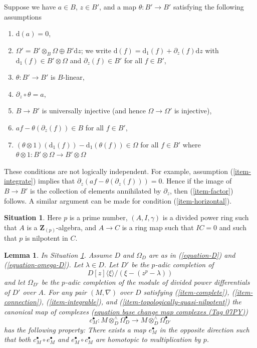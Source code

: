 \documentclass{amsart}
\theoremstyle{plain}
\newtheorem{lemma}[subsection]{Lemma}
\theoremstyle{definition}
\newtheorem{situation}[subsection]{Situation}
\theoremstyle{remark}
\numberwithin{equation}{subsection}
\begin{document}
\medskip\noindent
Suppose we have $a \in B$, $z \in B'$, and a map $\theta : B' \to B'$
satisfying the following assumptions
\begin{enumerate}
\item
\label{item-d-a-zero}
$\text{d}(a) = 0$,
\item
\label{item-direct-sum}
$\Omega' = B' \otimes_B \Omega \oplus B'\text{d}z$; we write
$\text{d}(f) = \text{d}_1(f) + \partial_z(f) \text{d}z$
with $\text{d}_1(f) \in B' \otimes \Omega$ and $\partial_z(f) \in B'$
for all $f \in B'$,
\item
\label{item-theta-linear}
$\theta : B' \to B'$ is $B$-linear,
\item
\label{item-integrate}
$\partial_z \circ \theta = a$,
\item
\label{item-injective}
$B \to B'$ is universally injective (and hence $\Omega \to \Omega'$
is injective),
\item
\label{item-factor}
$af - \theta(\partial_z(f)) \in B$ for all $f \in B'$,
\item
\label{item-horizontal}
$(\theta \otimes 1)(\text{d}_1(f)) - \text{d}_1(\theta(f)) \in \Omega$
for all $f \in B'$ where
$\theta \otimes 1 : B' \otimes \Omega \to B' \otimes \Omega$
\end{enumerate}
These conditions are not logically independent.
For example, assumption (\ref{item-integrate}) implies
that $\partial_z(af - \theta(\partial_z(f))) = 0$.
Hence if the image of $B \to B'$ is the collection of
elements annihilated by $\partial_z$, then (\ref{item-factor})
follows. A similar argument can be made for condition (\ref{item-horizontal}).



\begin{situation}
\label{situation-affine}
Here $p$ is a prime number, $(A, I, \gamma)$ is a divided power
ring such that $A$ is a $\mathbf{Z}_{(p)}$-algebra, and $A \to C$ is a
ring map such that $IC = 0$ and such that $p$ is nilpotent in $C$.
\end{situation}

\begin{lemma}
\label{lemma-computation}
In Situation \ref{situation-affine}. Assume $D$ and $\Omega_D$ are as in
(\ref{equation-D}) and (\ref{equation-omega-D}).
Let $\lambda \in D$. Let $D'$ be the $p$-adic completion of
$$
D[z]\langle \xi \rangle/(\xi - (z^p - \lambda))
$$
and let $\Omega_{D'}$ be the $p$-adic completion of the module of
divided power differentials of $D'$ over $A$. For any pair $(M, \nabla)$
over $D$ satisfying (\ref{item-complete}), (\ref{item-connection}),
(\ref{item-integrable}), and (\ref{item-topologically-quasi-nilpotent})
the canonical map of complexes (\href{https://stacks.math.columbia.edu/tag/07PY}{equation base change map complexes (Tag 07PY)})
$$
c_M^\bullet : M \otimes_D^\wedge \Omega^\bullet_D
\longrightarrow
M \otimes_D^\wedge \Omega^\bullet_{D'}
$$
has the following property: There exists a map $e_M^\bullet$
in the opposite direction such that both $c_M^\bullet \circ e_M^\bullet$
and $e_M^\bullet \circ c_M^\bullet$ are homotopic to multiplication by $p$.
\end{lemma}
\end{document}
